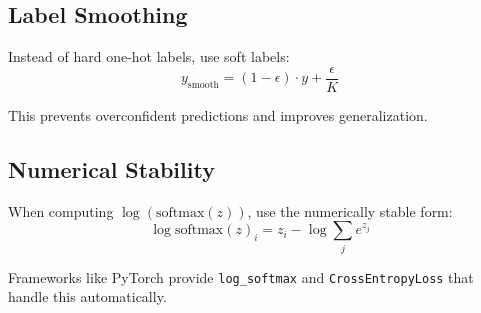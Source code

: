 \subsection{Label Smoothing}

Instead of hard one-hot labels, use soft labels:
\[
y_{\text{smooth}} = (1 - \epsilon) \cdot y + \frac{\epsilon}{K}
\]

This prevents overconfident predictions and improves generalization.

\subsection{Numerical Stability}

When computing $\log(\text{softmax}(z))$, use the numerically stable form:
\[
\log \text{softmax}(z)_i = z_i - \log\sum_j e^{z_j}
\]

Frameworks like PyTorch provide \texttt{log\_softmax} and \texttt{CrossEntropyLoss} that handle this automatically.
